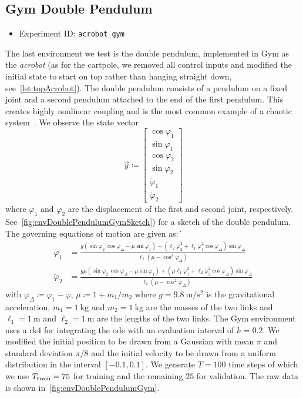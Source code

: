	\subsection{Gym Double Pendulum}
		\begin{itemize}
			\item Experiment ID: \texttt{acrobot\_gym}
		\end{itemize}

		The last environment we test is the double pendulum, implemented in Gym as the \emph{acrobot} (as for the cartpole, we removed all control inputs and modified the initial state to start on top rather than hanging straight down, see~\autoref{lst:topAcrobot}). The double pendulum consists of a pendulum on a fixed joint and a second pendulum attached to the end of the first pendulum. This creates highly nonlinear coupling and is the most common example of a chaotic system~\cite{shinbrotChaosDoublePendulum1992}. We observe the state vector
		\begin{equation*}
			\vec{y} \coloneqq
				\begin{bmatrix}
					\cos\varphi_1 \\
					\sin\varphi_1 \\
					\cos\varphi_2 \\
					\sin\varphi_2 \\
					\dot{\varphi}_1 \\
					\dot{\varphi}_2
				\end{bmatrix}
		\end{equation*}
		where \(\varphi_1\) and \(\varphi_2\) are the displacement of the first and second joint, respectively. See~\autoref{fig:envDoublePendulumGymSketch}) for a sketch of the double pendulum. The governing equations of motion are given as:´
		\begin{align*}
			\ddot{\varphi}_1 &= \frac{g (\sin\varphi_2 \, \cos\varphi_\Delta - \mu \sin\varphi_1) - (\ell_2 \dot{\varphi}_2^2 + \ell_1 \dot{\varphi}_1^2 \cos\varphi_\Delta) \sin\varphi_\Delta}{\ell_1 (\mu - \cos^2\varphi_\Delta)} \\
			\ddot{\varphi}_2 &= \frac{g \mu (\sin\varphi_2 \, \cos\varphi_\Delta - \mu \sin\varphi_1) + (\mu \ell_1 \dot{\varphi}_1^2 + \ell_2 \dot{\varphi}_2^2 \cos\varphi_\Delta) \sin\varphi_\Delta}{\ell_2 (\mu - \cos^2\varphi_\Delta)}
		\end{align*}
		with \( \varphi_\Delta \coloneqq \varphi_1 - \varphi \), \( \mu \coloneqq 1 + m_1/m_2 \) where \( g = \SI{9.8}{\meter\per\second\squared} \) is the gravitational acceleration, \( m_1 = \SI{1}{\kilogram} \) and \( m_2 = \SI{1}{\kilogram} \) are the masses of the two links and \( \ell_1 = \SI{1}{\meter} \) and \( \ell_2 = \SI{1}{\meter} \) are the lengths of the two links. The Gym environment uses a \ac{rk4} for integrating the \ac{ode} with an evaluation interval of \( h = 0.2 \). We modified the initial position to be drawn from a Gaussian with mean \( \pi \) and standard deviation \( \pi/8 \) and the initial velocity to be drawn from a uniform distribution in the interval \( [-0.1, 0.1] \). We generate \( T = 100 \) time steps of which we use \( T_{\mathrm{train}} = 75 \) for training and the remaining \(25\) for validation. The raw data is shown in~\autoref{fig:envDoublePendulumGym}.

